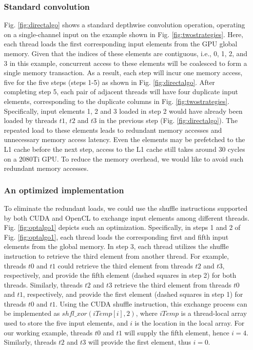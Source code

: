 \subsubsection{Standard convolution} Fig. \ref{fig:directalgo} shows a standard depthwise convolution operation, operating on a single-channel input on the example shown in Fig. \ref{fig:twostrategies}.
Here, each thread loads the first corresponding input elements from the GPU global memory. Given that the indices of these elements are
contiguous, i.e., 0, 1, 2, and 3 in this example, concurrent access to these elements will be coalesced to form a single memory
transaction. As a result, each step will incur one memory access, five for the five steps (steps 1-5) as shown in Fig.
\ref{fig:directalgo}. After completing step 5, each pair of adjacent threads will have four duplicate input elements, corresponding to the
duplicate columns in Fig. \ref{fig:twostrategies}. Specifically, input elements 1, 2 and 3 loaded in step 2 would have already been
loaded by threads $t1$, $t2$ and $t3$ in the previous step (Fig. \ref{fig:directalgo}). The repeated load to these elements leads to
redundant memory accesses and unnecessary memory access latency. Even the elements may be prefetched to the L1 cache before the next step,
access to the L1 cache still takes around 30 cycles on a 2080Ti GPU. To reduce the memory overhead, we would like to avoid such redundant
memory accesses.

\subsubsection{An optimized implementation} To eliminate the redundant loads, we could use the shuffle instructions supported by both CUDA and OpenCL to exchange input elements among
different threads. Fig. \ref{fig:optalgo1} depicts such an optimization. Specifically, in steps 1 and 2 of Fig. \ref{fig:optalgo1},
each thread loads the corresponding first and fifth input elements from the global memory. In step 3, each thread utilizes the shuffle
instruction to retrieve the third element from another thread. For example, threads $t0$ and $t1$ could retrieve the third element from
threads $t2$ and $t3$, respectively, and provide the fifth element (dashed squares in step 2) for both threads. Similarly, threads $t2$ and
$t3$ retrieve the third element from threads $t0$ and $t1$, respectively, and provide the first element (dashed squares in step 1) for
threads $t0$ and $t1$. Using the CUDA shuffle instruction, this exchange process can be implemented as $shfl\_xor(iTemp[i],2)$, where
$iTemp$ is a thread-local array used to store the five input elements, and $i$ is the location in the local array. For our working example,
threads $t0$ and $t1$ will supply the fifth element, hence $i=4$. Similarly, threads $t2$ and $t3$ will provide the first element, thus
$i=0$.

